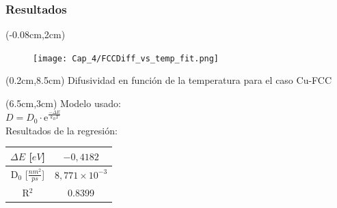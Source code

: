 \begin{frame}
 \frametitle{Resultados}
 
  \begin{textblock*}{6.5cm}(-0.08cm,2cm) 
   \begin{figure}[htp]
    \centering
    \texttt{[image: Cap\_4/FCCDiff\_vs\_temp\_fit.png]}
   \end{figure}
  \end{textblock*}
  \begin{textblock*}{12cm}(0.2cm,8.5cm) 
    \centering
    Difusividad en funci\'on de la temperatura para el caso Cu-FCC
  \end{textblock*}
  
  \begin{textblock*}{6cm}(6.5cm,3cm)
    Modelo usado: \\
    \vspace{0.5cm}
    $D = D_{0}\cdot \mathrm{e}^{\frac{-\Delta E}{k_{B} T}}$\\
    \vspace{0.5cm}
    Resultados de la regresi\'on:
    \begin{table}[htp]
      \begin{center}
      \begin{tabular}{*{2}{c}}
      \hline
      $\Delta E$ [$eV$]& $-0,4182$ \\
      \hline
      D$_{0}$ [$\frac{nm^{2}}{ps}$] & $8,771\times 10^{-3}$\\
      \hline
      R$^{2}$ & 0.8399 \\
      \hline
      \end{tabular}
      \end{center}
      \end{table}    
  \end{textblock*} 
\end{frame}

